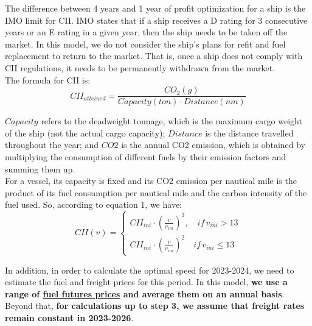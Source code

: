 \documentclass[a4paper,12pt]{article}
\begin{document}
The difference between 4 years and 1 year of profit optimization for a ship is the IMO limit for CII.
IMO states that if a ship receives a D rating for 3 consecutive years or an E rating in a given year, then the ship needs to be taken off the market.
In this model, we do not consider the ship's plans for refit and fuel replacement to return to the market.
That is, once a ship does not comply with CII regulations, it needs to be permanently withdrawn from the market.\\

The formula for CII is:
\begin{equation}
	\label{eq:cii}
	CII_{atteined} = \frac{CO_2(g)}{Capacity(ton) \cdot Distance(nm)}
\end{equation}

$Capacity$ refers to the deadweight tonnage, which is the maximum cargo weight of the ship (not the actual cargo capacity);
$Distance$ is the distance travelled throughout the year;
and $CO2$ is the annual CO2 emission, which is obtained by multiplying the consumption of different fuels by their emission factors and summing them up.\\

For a vessel, its capacity is fixed and its CO2 emission per nautical mile is the product of its fuel consumption per nautical mile and the carbon intensity of the fuel used.
So, according to equation 1, we have:
\begin{equation}
	\label{eq:cii_model}
	CII(v) =
	\left\{
	\begin{aligned}
		CII_{ini}\cdot (\frac{v}{v_{ini}})^3, \quad if \, v_{ini} > 13 \\
		CII_{ini} \cdot (\frac{v}{v_{ini}})^2 \quad if \, v_{ini}\leq 13
	\end{aligned}
	\right.
\end{equation}

In addition, in order to calculate the optimal speed for 2023-2024, we need to estimate the fuel and freight prices for this period.
In this model, \textbf{we use a range of \href{https://www.cmegroup.com/markets/energy/refined-products/singapore-380cst-fuel-oil-platts-swap-futures.html}{fuel futures prices} and average them on an annual basis}.
Beyond that, \textbf{for calculations up to step 3, we assume that freight rates remain constant in 2023-2026}.\\
\end{document}
